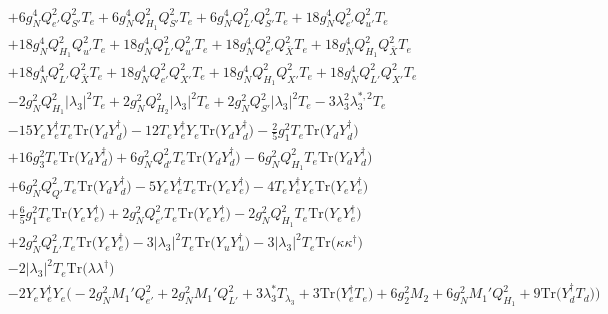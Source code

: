 {\begin{align}
 &+6 g_{N}^{4} Q_{e'}^{2} Q_{S'}^{2} T_e +6 g_{N}^{4} Q_{H_1}^{2} Q_{S'}^{2} T_e +6 g_{N}^{4} Q_{L'}^{2} Q_{S'}^{2} T_e +18 g_{N}^{4} Q_{e'}^{2} Q_{u'}^{2} T_e \nonumber \\ 
 &+18 g_{N}^{4} Q_{H_1}^{2} Q_{u'}^{2} T_e +18 g_{N}^{4} Q_{L'}^{2} Q_{u'}^{2} T_e +18 g_{N}^{4} Q_{e'}^{2} Q_{\bar{X}}^{2} T_e +18 g_{N}^{4} Q_{H_1}^{2} Q_{\bar{X}}^{2} T_e \nonumber \\ 
 &+18 g_{N}^{4} Q_{L'}^{2} Q_{\bar{X}}^{2} T_e +18 g_{N}^{4} Q_{e'}^{2} Q_{X'}^{2} T_e +18 g_{N}^{4} Q_{H_1}^{2} Q_{X'}^{2} T_e +18 g_{N}^{4} Q_{L'}^{2} Q_{X'}^{2} T_e \nonumber \\ 
 &-2 g_{N}^{2} Q_{H_1}^{2} |\lambda_3|^2 T_e +2 g_{N}^{2} Q_{H_2}^{2} |\lambda_3|^2 T_e +2 g_{N}^{2} Q_{S'}^{2} |\lambda_3|^2 T_e -3 \lambda_{3}^{2} \lambda_{3}^{*,2} T_e \nonumber \\ 
 &-15 {Y_e  Y_{e}^{\dagger}  T_e} \mbox{Tr}\Big({Y_d  Y_{d}^{\dagger}}\Big) -12 {T_e  Y_{e}^{\dagger}  Y_e} \mbox{Tr}\Big({Y_d  Y_{d}^{\dagger}}\Big) -\frac{2}{5} g_{1}^{2} T_e \mbox{Tr}\Big({Y_d  Y_{d}^{\dagger}}\Big) \nonumber \\ 
 &+16 g_{3}^{2} T_e \mbox{Tr}\Big({Y_d  Y_{d}^{\dagger}}\Big) +6 g_{N}^{2} Q_{d'}^{2} T_e \mbox{Tr}\Big({Y_d  Y_{d}^{\dagger}}\Big) -6 g_{N}^{2} Q_{H_1}^{2} T_e \mbox{Tr}\Big({Y_d  Y_{d}^{\dagger}}\Big) \nonumber \\ 
 &+6 g_{N}^{2} Q_{Q'}^{2} T_e \mbox{Tr}\Big({Y_d  Y_{d}^{\dagger}}\Big) -5 {Y_e  Y_{e}^{\dagger}  T_e} \mbox{Tr}\Big({Y_e  Y_{e}^{\dagger}}\Big) -4 {T_e  Y_{e}^{\dagger}  Y_e} \mbox{Tr}\Big({Y_e  Y_{e}^{\dagger}}\Big) \nonumber \\ 
 &+\frac{6}{5} g_{1}^{2} T_e \mbox{Tr}\Big({Y_e  Y_{e}^{\dagger}}\Big) +2 g_{N}^{2} Q_{e'}^{2} T_e \mbox{Tr}\Big({Y_e  Y_{e}^{\dagger}}\Big) -2 g_{N}^{2} Q_{H_1}^{2} T_e \mbox{Tr}\Big({Y_e  Y_{e}^{\dagger}}\Big) \nonumber \\ 
 &+2 g_{N}^{2} Q_{L'}^{2} T_e \mbox{Tr}\Big({Y_e  Y_{e}^{\dagger}}\Big) -3 |\lambda_3|^2 T_e \mbox{Tr}\Big({Y_u  Y_{u}^{\dagger}}\Big) -3 |\lambda_3|^2 T_e \mbox{Tr}\Big({\kappa  \kappa^{\dagger}}\Big) \nonumber \\ 
 &-2 |\lambda_3|^2 T_e \mbox{Tr}\Big({\lambda  \lambda^{\dagger}}\Big) \nonumber \\ 
 &-2 {Y_e  Y_{e}^{\dagger}  Y_e} \Big(-2 g_{N}^{2} M_1' Q_{e'}^{2}  + 2 g_{N}^{2} M_1' Q_{L'}^{2}  + 3 \lambda_3^* T_{\lambda_3}  + 3 \mbox{Tr}\Big({Y_{e}^{\dagger}  T_e}\Big)  + 6 g_{2}^{2} M_2  + 6 g_{N}^{2} M_1' Q_{H_1}^{2}  + 9 \mbox{Tr}\Big({Y_{d}^{\dagger}  T_d}\Big) \Big)\nonumber \\ 

\end{align}}
